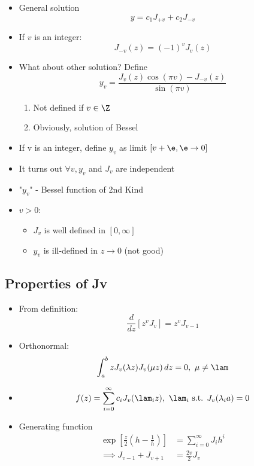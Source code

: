 \documentclass[Maths.tex]{subfiles}
\begin{document}
\begin{itemize}
\begin{equation}
	\end{equation}
	\item General solution
	\begin{equation}
		y = c_1J_{+v} + c_2J_{-v}
	\end{equation}
	\item If $v$ is an integer:
	\begin{equation}
		J_{-v}(z) = (-1)^vJ_v(z)
	\end{equation}
	\item What about other solution? Define
	\begin{equation}
		y_v = \frac{J_v(z)\cos(\pi v) - J_{-v}(z)}{\sin(\pi v)}
	\end{equation}
	\begin{enumerate}
		\item Not defined if $v \in \Z$
		\item Obviously, solution of Bessel
	\end{enumerate}
	\item If v is an integer, define $y_v$ as limit $[v+\e, \e \to 0]$
	\item It turns out $\forall v, y_v$ and $J_v$ are independent
	\item "$y_v$" - Bessel function of 2nd Kind
	\item $v > 0$:
	\begin{itemize}
		\item $J_v$ is well defined in $[0,\infty]$
		\item $y_v$ is ill-defined in $z \to 0$ (not good)
	\end{itemize}
\end{itemize}

\subsection{Properties of Jv}
\begin{itemize}
	\item From definition:
	\begin{equation}
		\frac{d}{dz}[z^vJ_v] = z^vJ_{v-1}
	\end{equation}
	\item Orthonormal:
	\begin{equation}
		\int_{a}^{b} zJ_v(\lambda z)J_v(\mu z)\,dz = 0,~ \mu \neq \lam
	\end{equation}
	\item
	\begin{equation}
		f(z) = \sum_{i=0}^\infty c_iJ_v(\lam_i z),~ \lam_i \text{ s.t. } J_v(\lambda_i a) = 0
	\end{equation}
	\item Generating function
	\begin{align}
		\exp\left[\frac{z}{2}\left(h - \frac{1}{h}\right)\right] &= \sum_{i=0}^\infty J_ih^i \\
		\implies J_{v-1} + J_{v+1} &= \frac{2v}{2}J_v
	\end{align}
\end{itemize}
\end{document}
